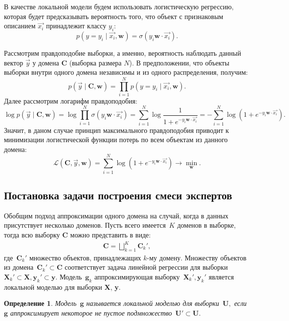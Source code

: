 \documentclass[12pt, twoside]{article}
\newtheorem{definition}{Определение}
\begin{document}
В качестве локальной модели будем использовать логистическую регрессию, которая будет предсказывать вероятность того, что объект с признаковым описанием $\vec{x_i}$ принадлежит классу $y_i$:
\[p\left(y = y_i \mid \vec{x_i}, \mathbf{w}\right) = \sigma(y_i \mathbf{w} \cdot \vec{x_i}).\]

Рассмотрим правдоподобие выборки, а именно, вероятность наблюдать данный вектор $\vec{y}$ у домена $\textbf{C}$ (выборка размера $N$). В предположении, что объекты выборки внутри одного домена независимы и из одного распределения, получим:
\[p \left(\vec{y} \mid \textbf{C}, \mathbf{w}\right) = \prod_{i=1}^{N} p\left(y = y_i \mid \vec{x_i}, \mathbf{w}\right).\]
Далее рассмотрим логарифм правдоподобия:
\[\log p\left(\vec{y} \mid \textbf{C}, \mathbf{w}\right) = \log \prod_{i=1}^{N} \sigma(y_i \mathbf{w} \cdot \vec{x_i}) = \sum_{i=1}^{N} \log \frac{1}{1 + e^{-y_i \mathbf{w} \cdot \vec{x_i}}} = - \sum_{i=1}^{N} \log (1 + e^{-y_i \mathbf{w} \cdot \vec{x_i}}).\]
Значит, в даном случае принцип максимального правдоподобия приводит к минимизации логистической функции потерь по всем объектам из данного домена:
\[\mathcal{L} (\textbf{C}, \vec{y}, \mathbf{w}) = \sum_{i=1}^{N} \log (1 + e^{-y_i \mathbf{w} \cdot \vec{x_i}}) \to \min_{\mathbf{w}}.\]



\subsection{Постановка задачи построения смеси экспертов}
Обобщим подход аппроксимации одного домена на случай, когда в данных присутствует несколько доменов. Пусть всего имеется~$K$ доменов в выборке, тогда всю выборку $\textbf{C}$ можно представить в виде:
\[
\label{eq:st:1}
\begin{aligned}
\textbf{C} = \bigsqcup \limits_{k=1}^{K}\textbf{C}_{k}',
\end{aligned}
\]
где~$\textbf{C}_{k}'$ множество объектов, принадлежащих $k$-му домену. Множеству объектов из домена~$\textbf{C}_{k}' \subset\textbf{C}$ соответствует задача линейной регрессии для выборки~$\textbf{X}_{k}' \subset \textbf{X}, \textbf{y}_{k}' \subset \textbf{y}$. Модель~$\mathbf{g}_k$ аппроксимирующая выборку~$\textbf{X}_{k}', \textbf{y}_{k}'$ является локальной моделью для выборки \textbf{X}, \textbf{y}.


\begin{definition}
\label{def:1}
Модель~$\mathbf{g}$ называется локальной моделью для выборки~$\textbf{U},$ если~$\mathbf{g}$ аппроксимирует некоторое не пустое подмножество~$\textbf{U}'\subset\textbf{U}$.
\end{definition}
\end{document}
